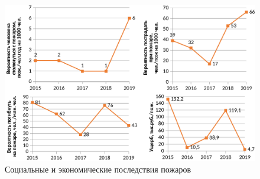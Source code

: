 \begin{figure}[H]
  \begin{center}
    \includegraphics[width=1\textwidth]{authors/zelencov_fig2.png}
  \end{center}
  \caption{Социальные и экономические последствия пожаров}
  \label{fig:zelencov-fig2}
\end{figure}
